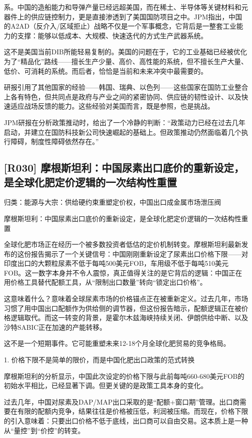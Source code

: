 \documentclass[11pt]{ctexart}
\begin{document}
系。中国的造船能力和导弹产量已经远超美国，而在稀土、半导体等关键材料和元器件上的供应链控制力，更是直接渗透到了美国国防项目之中。JPM指出，中国的A2AD（反介入/区域拒止）战略不仅是一个军事概念，它背后是一整套工业能力的支撑：能够以低成本、大规模、快速迭代的方式生产武器系统。

这不是美国当前DIB所能轻易复制的。美国的问题在于，它的工业基础已经被优化为了“精品化”路线——擅长生产少量、高价、高性能的系统，但不擅长生产大量、低价、可消耗的系统。而后者，恰恰是当前和未来冲突中最需要的。

研报引用了其他国家的经验——韩国、瑞典、以色列——这些国家在国防工业整合上各有特色，但共同点是政府与产业之间的紧密协同、供应链的韧性设计、以及快速适应战场反馈的能力。这些经验对美国而言，既是参照，也是挑战。

JPM研报在分析政策推动时，给出了一个冷静的判断：“政策动力已经在过去几年启动，并建立在国防科技新公司快速崛起的基础上。但政策推动仍然面临着几个执行障碍，制度性障碍依然存在。”

\subsection{[R030] 摩根斯坦利：中国尿素出口底价的重新设定，是全球化肥定价逻辑的一次结构性重置}
{\small\color{refgray}归类：能源与大宗：供给硬约束重塑定价权，中国出口成金属市场泄压阀}

摩根斯坦利：中国尿素出口底价的重新设定，是全球化肥定价逻辑的一次结构性重置

全球化肥市场正在经历一个被多数投资者低估的定价机制转变。摩根斯坦利最新发布的这份报告揭示了一个关键信号：中国刚刚重新设定了尿素出口价格下限——对印度出口的大颗粒尿素不低于每吨500美元FOB，车用级不低于每吨510美元FOB。这一数字本身并不令人震惊，真正值得关注的是它背后的逻辑：中国正在用价格工具替代配额工具，从“限制出口数量”转向“锁定出口价格”。

这意味着什么？意味着全球尿素市场的价格锚点正在被重新定义。过去几年，市场习惯了用中国出口配额作为供给侧的调节器，但这份报告暗示，配额逻辑正在被价格逻辑取代。而这一转变的背景，是霍尔木兹海峡持续关闭、伊朗供给中断、以及沙特SABIC正在加速的产能转移。

这不是一个短期事件。它可能重塑未来12-18个月全球化肥贸易的竞争格局。

1. 价格下限不是简单的限价，而是中国化肥出口政策的范式转换

摩根斯坦利的分析显示，中国此次设定的价格下限与此前每吨660-680美元FOB的初始水平相比，已经显著下调。但更关键的是政策工具本身的变化。

过去几年，中国对尿素及DAP/MAP出口采取的是“配额+窗口期”管理。出口商需要在有限的配额内竞争，结果往往是价格被压低，利润被压缩。而现在，价格下限的引入意味着：只要出口价格不低于底线，出口商可以自由交易。这本质上是一种从“量控”到“价控”的转变。
\end{document}

